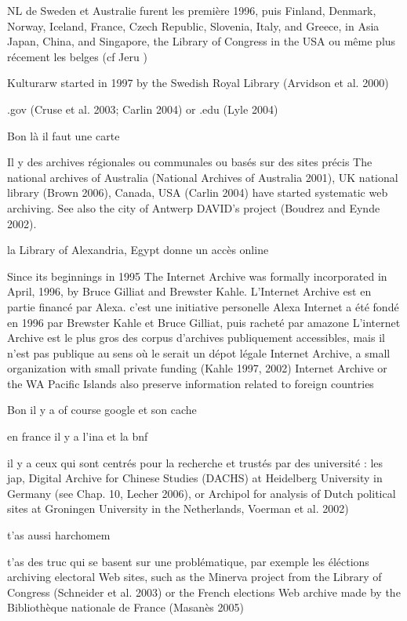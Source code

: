 \documentclass[symmetric,justified,marginals=raggedouter]{tufte-book}
\begin{document}
NL de Sweden et Australie furent les première 1996, puis Finland, Denmark, Norway, Iceland, France, Czech Republic, Slovenia, Italy, and Greece, in Asia Japan, China, and Singapore, the Library of Congress in the USA ou même plus récement les belges (cf Jeru )

Kulturarw started in 1997 by the Swedish Royal Library (Arvidson et al. 2000)

.gov (Cruse et al. 2003; Carlin 2004) or .edu (Lyle 2004)

Bon là il faut une carte

Il y des archives régionales ou communales ou basés sur des sites précis The national archives of Australia (National Archives of Australia 2001), UK national library (Brown 2006), Canada, USA (Carlin 2004) have started systematic web archiving. See also the city of Antwerp DAVID’s project (Boudrez and Eynde 2002).

la Library of Alexandria, Egypt donne un accès online

Since its beginnings in 1995
The Internet Archive was formally incorporated in April, 1996, by Bruce
Gilliat and Brewster Kahle.
L'Internet Archive est en partie financé par Alexa. c'est une initiative personelle
Alexa Internet a été fondé en 1996 par Brewster Kahle et Bruce Gilliat, puis racheté par amazone
L'internet Archive est le plus gros des corpus d'archives publiquement accessibles, mais il n'est pas publique au sens où le serait un dépot légale 
Internet Archive, a small organization with small private funding (Kahle 1997, 2002)
Internet Archive or the WA Pacific Islands also preserve information related to foreign countries

Bon il y a of course google et son cache

en france il y a l'ina et la bnf 

il y a ceux qui sont centrés pour la recherche et trustés par des université : les jap, Digital Archive for Chinese Studies (DACHS) at Heidelberg University
in Germany (see Chap. 10, Lecher 2006), or Archipol for analysis of Dutch political sites at Groningen University in the Netherlands, Voerman et al. 2002)

t'as aussi harchomem

t'as des truc qui se basent sur une problématique, par exemple les éléctions archiving electoral Web sites, such as the Minerva project
from the Library of Congress (Schneider et al. 2003) or the French elections Web archive made by the Bibliothèque nationale de France (Masanès 2005)
\end{document}
